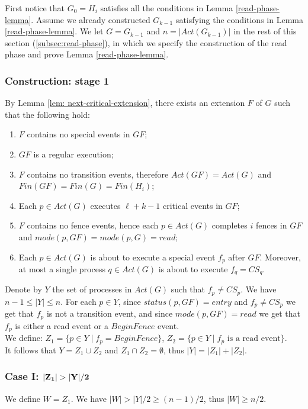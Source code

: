 \vspace{3mm} First notice that $G_0 = H_i$ satisfies all the conditions in Lemma \ref{read-phase-lemma}. Assume we already constructed $G_{k-1}$ satisfying the conditions in Lemma \ref{read-phase-lemma}. We let $G=G_{k-1}$ and $n=|Act(G_{k-1})|$ in the rest of this section (\ref{subsec:read-phase}), in which we specify the construction of the read phase and prove Lemma \ref{read-phase-lemma}.

\subsubsection{Construction: stage 1}
By Lemma \ref{lem: next-critical-extension}, there exists an extension $F$ of $G$ such that the following hold:
\begin{enumerate}
	\item $F$ contains no special events in $G F$;
	\item $G F$ is a regular execution;
	\item $F$ contains no transition events, therefore $Act(G F) = Act(G)$ and $Fin(G F) = Fin(G) = Fin(H_i)$;
	\item Each $p \in Act(G)$ executes $\ell+k-1$ critical events in $G F$;
	\item $F$ contains no fence events, hence each $p \in Act(G)$ completes $i$ fences in $G F$ and $mode(p,G F) = mode(p,G) = read$;
	\item Each $p \in Act(G)$ is about to execute a special event $f_p$ after $G F$. Moreover, at most a single process $q \in Act(G)$ is about to execute $f_q=CS_q$.
\end{enumerate}
Denote by $Y$ the set of processes in $Act(G)$ such that $f_p \neq CS_p$. We have $n-1 \leq |Y| \leq n$. For each $p \in Y$, since $status(p,G F) = entry$ and $f_p \neq CS_p$ we get that $f_p$ is not a transition event, and since $mode(p,G F) = read$ we get that $f_p$ is either a read event or a $BeginFence$ event.
\\ We define: $Z_1 = \{p \in Y \mid f_p = BeginFence\}$, $Z_2 = \{p \in Y \mid f_p \text{ is a read event}\}$.
\\ It follows that $Y = Z_1 \cup Z_2$ and $Z_1 \cap Z_2 = \emptyset$, thus $|Y|=|Z_1|+|Z_2|$.

\subsubsection*{\hspace{5mm} Case I: $\bf |Z_1| > |Y|/2$}
We define $W = Z_1$. We have $|W| > |Y|/2 \geq (n-1)/2$, thus $|W| \geq n/2$.

